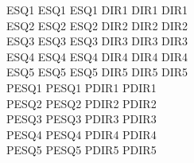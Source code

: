 \documentclass[12pt]{article}
\begin{document}
\fontsize{20}{40}\selectfont
ESQ1 ESQ1 ESQ1 \hfill DIR1 DIR1 DIR1\\
ESQ2 ESQ2 ESQ2 \hfill DIR2 DIR2 DIR2\\
ESQ3 ESQ3 ESQ3 \hfill DIR3 DIR3 DIR3\\
ESQ4 ESQ4 ESQ4 \hfill DIR4 DIR4 DIR4\\
ESQ5 ESQ5 ESQ5 \hfill DIR5 DIR5 DIR5\\
\newpage
PESQ1 PESQ1 \hfill PDIR1 PDIR1\\
PESQ2 PESQ2 \hfill PDIR2 PDIR2\\
PESQ3 PESQ3 \hfill PDIR3 PDIR3\\
PESQ4 PESQ4 \hfill PDIR4 PDIR4\\
PESQ5 PESQ5 \hfill PDIR5 PDIR5\\
\end{document}
